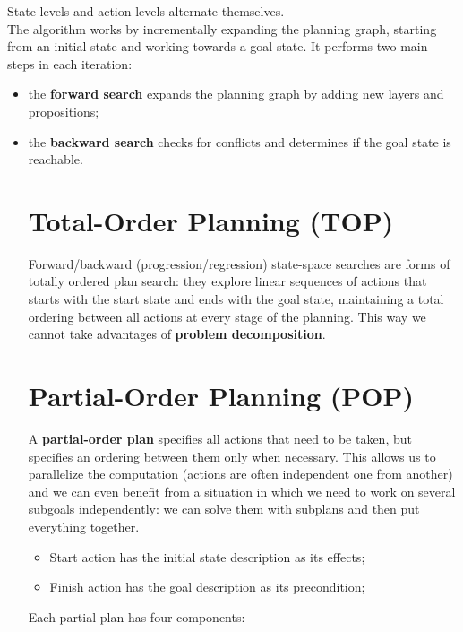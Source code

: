 \documentclass{article}
\begin{document}
State levels and action levels alternate themselves. \\

The algorithm works by incrementally expanding the planning graph, starting from an initial state and working towards a goal state. It performs two main steps in each iteration: 

\begin{itemize}
    \item the \textbf{forward search} expands the planning graph by adding new layers and propositions;
    \item the \textbf{backward search} checks for conflicts and determines if the goal state is reachable.
\newpage

\section{Total-Order Planning (TOP)}

Forward/backward (progression/regression) state-space searches are forms of totally ordered plan search: they explore linear sequences of actions that starts with the start state and ends with the goal state, maintaining a total ordering between all actions at every stage of the planning. This way we cannot take advantages of \textbf{problem decomposition}.

\section{Partial-Order Planning (POP)}

A \textbf{partial-order plan} specifies all actions that need to be taken, but specifies an ordering between them only when necessary. This allows us to parallelize the computation (actions are often independent one from another) and we can even benefit from a situation in which we need to work on several subgoals independently: we can solve them with subplans and then put everything together. \\

\begin{itemize}
    \item Start action has the initial state description as its effects;
    \item Finish action has the goal description as its precondition;
\end{itemize}

\begin{flushleft}
    Each partial plan has four components:
\end{flushleft}


\end{itemize}
\end{document}
